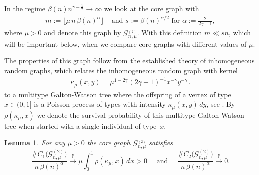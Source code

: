 \documentclass[12pt,a4paper]{article}
\numberwithin{equation}{section}
\newtheorem{lemma}[shared]{Lemma}
\begin{document}
\noindent In the regime  $\beta(n)n^{\gamma-\tfrac{1}{2}}\to \infty$ we look at the core graph with 
\begin{align}\label{mmudef}
    m:=\lfloor \mu \,n\,\beta(n)^{\alpha}\rfloor & \text{ and } s:=\beta(n)^{\alpha /2 } \text{  for } \alpha:=\tfrac{2}{2\gamma-1},
\end{align} 
where $\mu>0$ and denote this graph by $\mathcal G_{n,\mu}^{_{(2)}}$.
With this definition $m\ll sn $, which will be important below, when we compare core graphs with different values of $\mu$.\smallskip

{The properties of this graph follow from the established theory of inhomogeneous random graphs, which relates the inhomogeneous random graph with kernel 
\begin{align}\label{kappamu}
    \kappa_\mu(x,y)= \mu^{1-2\gamma}(2\gamma-1)^{-1}x^{-\gamma}y^{-\gamma}\,.
\end{align}
to a multitype Galton-Watson tree where the offspring of a vertex of type $x\in(0,1]$ is a Poisson process of types with intensity $\kappa_\mu(x,y) \, dy$, see \cite{rjb, rg1, rg2}. By $\rho(\kappa_\mu,x)$ we denote the survival probability of this multitype Galton-Watson tree when started with a single individual of type~$x$.}

\begin{lemma}\label{lem1} 
        	For any $\mu>0$ the core graph $\mathcal G_{n,\mu}^{_{(2)}}$ satisfies
        $$ \frac{\#C_1\big(\mathcal G_{n,\mu}^{(2)}\big)}{n\,\beta(n)^{\alpha}}\overset{\mathbb P}{\longrightarrow} \mu \int_0^1 \rho(\kappa_\mu, x) \, dx >0\quad \text{ and } \quad \frac{\#C_2\big(\mathcal G_{n,\mu}^{(2)}\big)}{n\,\beta(n)^{\alpha}}\overset{\mathbb P}{\longrightarrow}0.$$  
\end{lemma}
\end{document}
